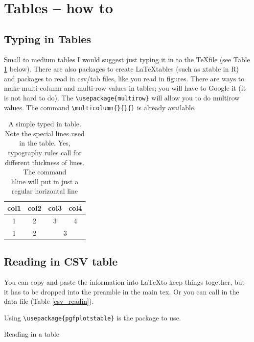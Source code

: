\section{Tables -- how to}

\subsection{Typing in Tables}
Small to medium tables I would suggest just typing it in to the \TeX file (see Table \ref{simpleTable} below). There are also packages to create \LaTeX tables (such as xtable in R) and packages to read in csv/tab files, like you read in figures. There are ways to make multi-column and multi-row values in tables; you will have to Google it (it is not hard to do). The \verb+\usepackage{multirow}+ will allow you to do multirow values. The command \verb+\multicolumn{}{}{}+ is already available. 

\begin{table}[h]
\centering
\caption[Simple table]{A simple typed in table. Note the special lines used in the table. Yes, typography rules call for different thickness of lines. The command \\hline will put in just a regular horizontal line}
\label{simpleTable}
\begin{tabular}{c|ccc} 
\toprule
col1 & col2 & col3 & col4 \\
\midrule
1 & 2 & 3 & 4 \\
1 & 2 & \multicolumn{2}{c}{3} \\
\bottomrule
\end{tabular}
\end{table}



\subsection{Reading in CSV table}

You can copy and paste the information into \LaTeX to keep things together, but it has to be dropped into the preamble in the main tex. Or you can call in the data file (Table \ref{csv_readin}).

Using \verb+\usepackage{pgfplotstable}+ is the package to use.

\begin{table}[h]
\centering
\caption[Normal size table]{Reading in a table}
\label{csv_readin}
\end{table}

